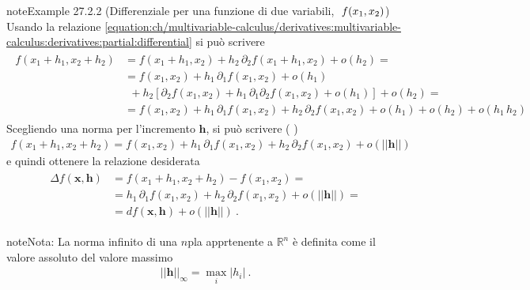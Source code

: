 \documentclass[letterpaper,10pt,italian]{jupyterBook}
\begin{document}
\begin{sphinxadmonition}{note}{Example 27.2.2 (Differenziale per una funzione di due variabili, \protect\(\ f(x_1, x_2) \protect\))}
\sphinxAtStartPar
Usando la relazione \eqref{equation:ch/multivariable-calculus/derivatives:multivariable-calculus:derivatives:partial:differential} si può scrivere
\begin{equation*}
\begin{split}\begin{aligned}
f(x_1 + h_1, x_2 + h_2)
  & = f(x_1 + h_1, x_2 ) + h_2 \, \partial_{2} f(x_1 + h_1, x_2) + o(h_2) = \\
  & = f(x_1, x_2) + h_1 \, \partial_{1} f(x_1, x_2) + o(h_1) \\
  & \ \ + h_2 \left[ \partial_{2} f(x_1, x_2) + h_1 \, \partial_{1}\partial_{2} f(x_1, x_2) + o (h_1) \right] + o(h_2) = \\
  & = f(x_1, x_2) + h_1 \, \partial_{1} f(x_1, x_2) + h_2 \, \partial_{2} f(x_1, x_2) + o(h_1) + o(h_2) + o(h_1 \, h_2) 
\end{aligned}\end{split}
\end{equation*}
\sphinxAtStartPar
Scegliendo una norma per l’incremento \(\mathbf{h}\), si può scrivere ( )
\begin{equation*}
\begin{split}
f(x_1 + h_1, x_2 + h_2) = f(x_1, x_2) + h_1 \, \partial_{1} f(x_1, x_2) + h_2 \, \partial_{2} f(x_1, x_2) + o(||\mathbf{h}||)
\end{split}
\end{equation*}
\sphinxAtStartPar
e quindi ottenere la relazione desiderata
\begin{equation*}
\begin{split}\begin{aligned}
\Delta f(\mathbf{x}, \mathbf{h}) & = f(x_1 + h_1, x_2 + h_2) - f(x_1, x_2) = \\
                                 & = h_1 \, \partial_{1} f(x_1, x_2) + h_2 \, \partial_{2} f(x_1, x_2) + o(||\mathbf{h}||) = \\
                                 & = d f(\mathbf{x}, \mathbf{h}) + o(||\mathbf{h}||) \ .
\end{aligned}\end{split}
\end{equation*}\end{sphinxadmonition}

\begin{sphinxadmonition}{note}{Nota:}
\sphinxAtStartPar
{}
La norma infinito di una \(n\)\sphinxhyphen{}pla apprtenente a \(\mathbb{R}^n\) è definita come il valore assoluto del valore massimo
\begin{equation*}
\begin{split}||\mathbf{h}||_{\infty} = \max_i |h_i| \ .\end{split}
\end{equation*}\end{sphinxadmonition}
\end{document}
